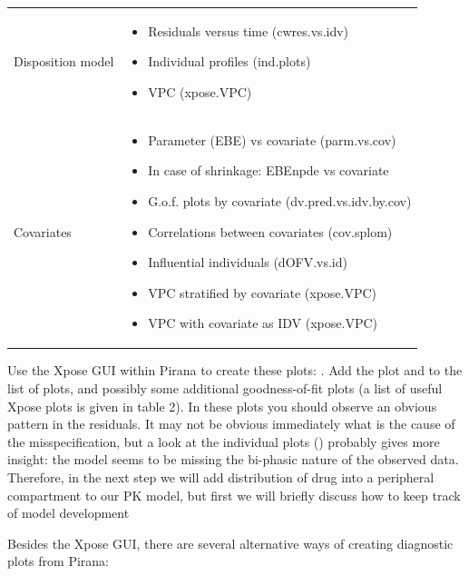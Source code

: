 \begin{landscape}
\footnotesize
\begin{tabular}{ p{4cm} p{12cm} }
Disposition model & 
\begin{itemize}
\item Residuals versus time (cwres.vs.idv)
\item Individual profiles (ind.plots)
\item VPC (xpose.VPC)
\end{itemize} \\
Covariates &
\begin{itemize}
\item Parameter (EBE) vs covariate (parm.vs.cov)
\item In case of shrinkage: EBEnpde vs covariate 
\item G.o.f. plots by covariate (dv.pred.vs.idv.by.cov)
\item Correlations between covariates (cov.splom)
\item Influential individuals (dOFV.vs.id)
\item VPC stratified by covariate (xpose.VPC)
\item VPC with covariate as IDV (xpose.VPC)
\end{itemize} \\
\end{tabular}
\end{landscape}
\normalsize

\noindent Use the Xpose GUI within Pirana to create these plots:
. Add the plot  and 
to the list of plots, and possibly some additional goodness-of-fit
plots (a list of useful Xpose plots is given in table 2). In these
plots you should observe an obvious pattern in the residuals. It may
not be obvious immediately what is the cause of the misspecification,
but a look at the individual plots () probably gives more
insight: the model seems to be missing the bi-phasic nature of the
observed data. Therefore, in the next step we will add distribution of
drug into a peripheral compartment to our PK model, but first we will
briefly discuss how to keep track of model development

Besides the Xpose GUI, there are several alternative ways of creating
diagnostic plots from Pirana:

